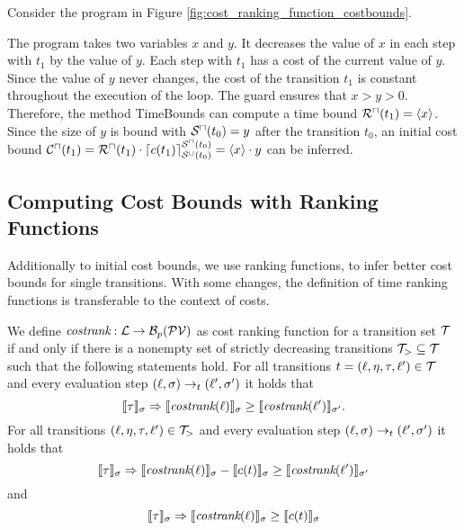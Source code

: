 \begin{example}
  Consider the program in Figure \ref{fig:cost_ranking_function_costbounds}.
  
  The program takes two variables $x$ and $y$.
  It decreases the value of $x$ in each step with $t_1$ by the value of $y$.
  Each step with $t_1$ has a cost of the current value of $y$.
  Since the value of $y$ never changes, the cost of the transition $t_1$ is constant throughout the execution of the loop.
  The guard ensures that $x > y > 0$.
  Therefore, the method TimeBounds can compute a time bound ${\mathcal{R}^\sqcap}(t_1) = \langle x\rangle$.
  Since the size of $y$ is bound with ${\mathcal{S}^\sqcap}(t_0) = y$ after the transition $t_0$, an initial cost bound ${\mathcal{C}^\sqcap}(t_1) = {\mathcal{R}^\sqcap}(t_1) \cdot \lceil c(t_1) \rceil^{{\mathcal{S}^\sqcap}(t_0)}_{{\mathcal{S}^\sqcup}(t_0)} = \langle x\rangle \cdot y$ can be inferred.
\end{example}

\subsection{Computing Cost Bounds with Ranking Functions}

Additionally to initial cost bounds, we use ranking functions, to infer better cost bounds for single transitions.
With some changes, the definition of time ranking functions is transferable to the context of costs.

\begin{definition} 
  We define $\emph{costrank}: \mathcal{L} \rightarrow \mathcal{B}_p(\mathcal{PV})$ as cost ranking function for a transition set $\mathcal{T}$ if and only if there is a nonempty set of strictly decreasing transitions $\mathcal{T}_{>} \subseteq \mathcal{T}$ such that the following statements hold.
  For all transitions $t = (\ell, \eta, \tau, \ell') \in \mathcal{T}$ and every evaluation step $(\ell, \sigma) \rightarrow_t (\ell', \sigma')$ it holds that
  \[ \llbracket \tau \rrbracket_{\sigma} \Rightarrow \llbracket \emph{costrank}(\ell) \rrbracket_{\sigma} \geq \llbracket \emph{costrank}(\ell') \rrbracket_{\sigma'}. \]
  For all transitions $(\ell, \eta, \tau, \ell') \in \mathcal{T}_{>}$ and every evaluation step $(\ell, \sigma) \rightarrow_t (\ell', \sigma')$ it holds that        
  \[ \llbracket \tau \rrbracket_{\sigma} \Rightarrow \llbracket \emph{costrank}(\ell) \rrbracket_{\sigma} - \llbracket c(t) \rrbracket_{\sigma} \geq \llbracket \emph{costrank}(\ell') \rrbracket_{\sigma'} \]
  and
  \[ \llbracket \tau \rrbracket_{\sigma} \Rightarrow \llbracket \emph{costrank}(\ell) \rrbracket_{\sigma} \geq \llbracket c(t) \rrbracket_{\sigma} \]
\end{definition}

